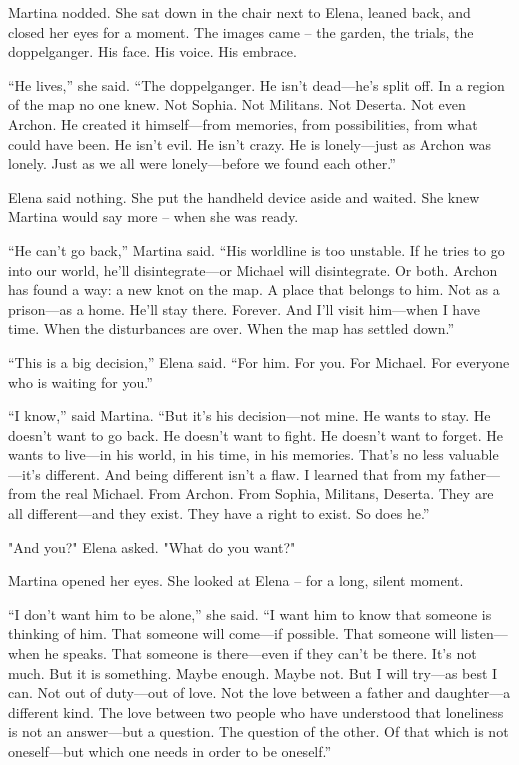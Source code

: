 \documentclass[
]{article}
\begin{document}
Martina nodded. She sat down in the chair next to Elena, leaned back, and closed her eyes for a moment. The images came -- the garden, the trials, the doppelganger. His face. His voice. His embrace.

``He lives,'' she said. ``The doppelganger. He isn't dead---he's split off. In a region of the map no one knew. Not Sophia. Not Militans. Not Deserta. Not even Archon. He created it himself---from memories, from possibilities, from what could have been. He isn't evil. He isn't crazy. He is lonely---just as Archon was lonely. Just as we all were lonely---before we found each other.''

Elena said nothing. She put the handheld device aside and waited. She knew Martina would say more -- when she was ready.

``He can't go back,'' Martina said. ``His worldline is too unstable. If he tries to go into our world, he'll disintegrate---or Michael will disintegrate. Or both. Archon has found a way: a new knot on the map. A place that belongs to him. Not as a prison---as a home. He'll stay there. Forever. And I'll visit him---when I have time. When the disturbances are over. When the map has settled down.''

``This is a big decision,'' Elena said. ``For him. For you. For Michael. For everyone who is waiting for you.''

``I know,'' said Martina. ``But it's his decision---not mine. He wants to stay. He doesn't want to go back. He doesn't want to fight. He doesn't want to forget. He wants to live---in his world, in his time, in his memories. That's no less valuable---it's different. And being different isn't a flaw. I learned that from my father---from the real Michael. From Archon. From Sophia, Militans, Deserta. They are all different---and they exist. They have a right to exist. So does he.''

"And you?" Elena asked. "What do you want?"

Martina opened her eyes. She looked at Elena -- for a long, silent moment.

``I don't want him to be alone,'' she said. ``I want him to know that someone is thinking of him. That someone will come---if possible. That someone will listen---when he speaks. That someone is there---even if they can't be there. It's not much. But it is something. Maybe enough. Maybe not. But I will try---as best I can. Not out of duty---out of love. Not the love between a father and daughter---a different kind. The love between two people who have understood that loneliness is not an answer---but a question. The question of the other. Of that which is not oneself---but which one needs in order to be oneself.''
\end{document}

